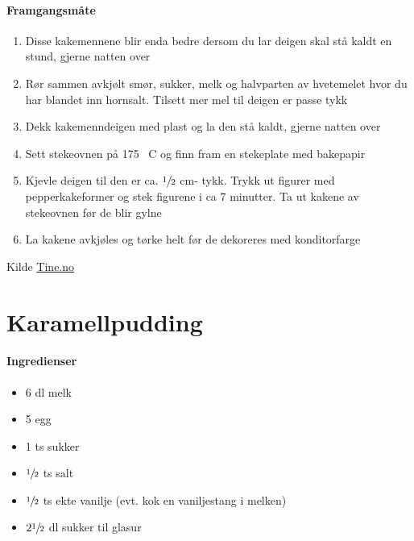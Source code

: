 \documentclass[12pt,a4paper]{book}
\begin{document}
\paragraph{Framgangsmåte}
\begin{enumerate}[noitemsep]
	\item Disse kakemennene blir enda bedre dersom du lar deigen skal stå kaldt en stund, gjerne natten over
	\item Rør sammen avkjølt smør, sukker, melk og halvparten av hvetemelet hvor du har blandet inn hornsalt. Tilsett mer mel til deigen er passe tykk
	\item Dekk kakemenndeigen med plast og la den stå kaldt, gjerne natten over
	\item Sett stekeovnen på 175 \degree~C og finn fram en stekeplate med bakepapir
	\item Kjevle deigen til den er ca. $\sfrac{1}{2}$ cm- tykk. Trykk ut figurer med pepperkakeformer og stek figurene i ca 7 minutter. Ta ut kakene av stekeovnen før de blir gylne
	\item La kakene avkjøles og tørke helt før de dekoreres med konditorfarge
\end{enumerate}


Kilde \href{http://www.tine.no/oppskrifter/kaker/vafler-og-smakaker/8721.cms?hvite-kakemenn-(og--damer)}{Tine.no}
\clearpage{}
\clearpage{}\section{Karamellpudding}

\paragraph{Ingredienser}
\begin{itemize}[noitemsep]
	\item 6 dl melk
	\item 5 egg
	\item 1 ts sukker
	\item $\sfrac{1}{2}$ ts salt
	\item $\sfrac{1}{2}$ ts ekte vanilje (evt. kok en vaniljestang i melken)
	\item $2 \sfrac{1}{2}$ dl sukker til glasur
\end{itemize}
\end{document}
